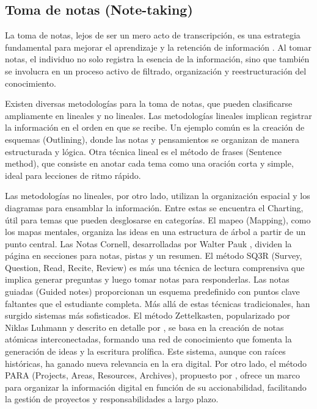 \subsection{Toma de notas (Note-taking)}
La toma de notas, lejos de ser un mero acto de transcripción, es una estrategia fundamental para mejorar el aprendizaje y la retención de información \parencite{jansenIntegrativeReviewCognitive2017}. Al tomar notas, el individuo no solo registra la esencia de la información, sino que también se involucra en un proceso activo de filtrado, organización y reestructuración del conocimiento.

Existen diversas metodologías para la toma de notas, que pueden clasificarse ampliamente en lineales y no lineales.
Las metodologías lineales implican registrar la información en el orden en que se recibe. Un ejemplo común es la creación de esquemas (Outlining), donde las notas y pensamientos se organizan de manera estructurada y lógica. Otra técnica lineal es el método de frases (Sentence method), que consiste en anotar cada tema como una oración corta y simple, ideal para lecciones de ritmo rápido.

Las metodologías no lineales, por otro lado, utilizan la organización espacial y los diagramas para ensamblar la información. Entre estas se encuentra el Charting, útil para temas que pueden desglosarse en categorías. El mapeo (Mapping), como los mapas mentales, organiza las ideas en una estructura de árbol a partir de un punto central. Las Notas Cornell, desarrolladas por Walter Pauk \parencite{paukHowStudyCollege2010}, dividen la página en secciones para notas, pistas y un resumen. El método SQ3R (Survey, Question, Read, Recite, Review) es más una técnica de lectura comprensiva que implica generar preguntas y luego tomar notas para responderlas. Las notas guiadas (Guided notes) proporcionan un esquema predefinido con puntos clave faltantes que el estudiante completa.
Más allá de estas técnicas tradicionales, han surgido sistemas más sofisticados. El método Zettelkasten, popularizado por Niklas Luhmann y descrito en detalle por \cite{ahrensHowTakeSmart2017}, se basa en la creación de notas atómicas interconectadas, formando una red de conocimiento que fomenta la generación de ideas y la escritura prolífica. Este sistema, aunque con raíces históricas, ha ganado nueva relevancia en la era digital. Por otro lado, el método PARA (Projects, Areas, Resources, Archives), propuesto por \cite{forteBuildingSecondBrain2022}, ofrece un marco para organizar la información digital en función de su accionabilidad, facilitando la gestión de proyectos y responsabilidades a largo plazo.

